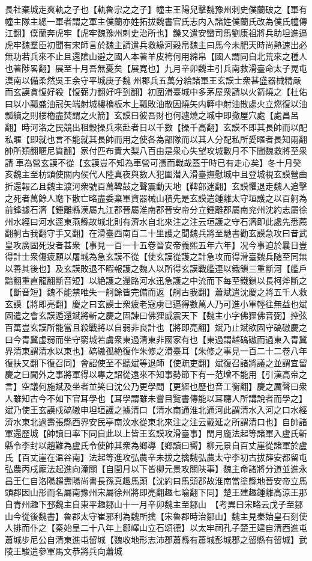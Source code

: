長社棄城走爽軌之子也【軌魯宗之之子】幢主王陽兒擊魏豫州刺史僕蘭破之【軍有幢主隊主總一軍者謂之軍主僕蘭亦姓拓拔魏書官氏志内入諸姓僕蘭氏改為僕氏幢傳江翻】僕蘭奔虎牢【虎牢魏豫州刺史治所也】鑠又遣安蠻司馬劉康祖將兵助坦進逼虎牢魏羣臣初聞有宋師言於魏主請遣兵救緣河穀帛魏主曰馬今未肥天時尚熱速出必無功若兵來不止且還隂山避之國人本著羊皮袴何用綿帛【國人謂同自北荒來之種人也著陟畧翻】展至十月吾無憂矣【展寛也】九月辛卯魏主引兵南救滑臺命太子晃屯漠南以備柔然吳王余守平城庚子魏州郡兵五萬分給諸軍王玄謨士衆甚盛器械精嚴而玄謨貪愎好殺【愎弼力翻好呼到翻】初圍滑臺城中多茅屋衆請以火箭燒之【杜佑曰以小瓢盛油冠矢端射城樓櫓板木上瓢敗油散因燒矢内簳中射油散處火立燃復以油瓢續之則樓櫓盡焚謂之火箭】玄謨曰彼吾財也何遽燒之城中即撤屋穴處【處昌呂翻】時河洛之民競出租穀操兵來赴者日以千數【操千高翻】玄謨不即其長帥而以配私暱【即就也言不能就其長帥而用之使各為部隊而以其人分配私所愛暱者長知兩翻帥所類翻暱尼質翻】家付匹布責大梨八百由是衆心失望攻城數月不下聞魏救將至衆請車為營玄謨不從【玄謨豈不知為車營可憑而戰哉蓋于時已有走心矣】冬十月癸亥魏主至枋頭使關内侯代人陸真夜與數人犯圍潜入滑臺撫慰城中且登城視玄謨營曲折還報乙且魏主渡河衆號百萬鞞鼔之聲震動天地【鞞部迷翻】玄謨懼退走魏人追擊之死者萬餘人麾下散亡略盡委棄軍資器械山積先是玄謨遣鍾離太守垣護之以百舸為前鋒據石濟【鍾離縣漢屬九江郡晉屬淮南郡晉安帝分立鍾離郡屬南兖州沈約志屬徐州水經曰河水逕東燕縣故城北則有濟水自北來注之注云垣護之守石濟即此處先悉薦翻舸古我翻守手又翻】在滑臺西南百二十里護之聞魏兵將至馳書勸玄謨急攻曰昔武皇攻廣固死没者甚衆【事見一百一十五卷晉安帝義熙五年六年】况今事迫於曩日豈得計士衆傷疲願以屠城為急玄謨不從【使玄謨從護之計急攻而得滑臺魏兵随至同無以善其後也】及玄謨敗退不暇報護之魏人以所得玄謨戰艦連以鐵鎻三重斷河【艦戶黯翻重直龍翻斷音短】以絶護之還路河水迅急護之中流而下每至鐵鎖以長柯斧斷之【斷音短】魏不能禁唯失一舸餘皆完備而返【舸古我翻】蕭斌遣沈慶之將五千人救玄謨【將即亮翻】慶之曰玄謨士衆疲老寇虜已逼得數萬人乃可進小軍輕往無益也斌固遣之會玄謨遁還斌將斬之慶之固諫曰佛狸威震天下【魏主小字佛狸佛音弼】控弦百萬豈玄謨所能當且殺戰將以自弱非良計也【將即亮翻】斌乃止斌欲固守碻磝慶之曰今青冀虚弱而坐守窮城若虜衆東過清東非國家有也【東過謂越碻磝而過東入青冀界清東謂清水以東也】碻磝孤絶復作朱修之滑臺耳【朱修之事見一百二十二卷八年復扶又翻下復召同】會詔使至不聽斌等退師【使疏吏翻】斌復召諸將議之並謂宜留慶之曰閫外之事將軍得以專之詔從遠來不知事勢節下有一范增不能用【引漢高帝之言】空議何施斌及坐者並笑曰沈公乃更學問【更經也歷也音工衡翻】慶之厲聲曰衆人雖知古今不如下官耳學也【耳學謂雖未嘗目覽書傳能以耳聽人所講說者而學之】斌乃使王玄謨戍碻磝申坦垣護之據清口【清水南通淮北通河此謂清水入河之口水經濟水東北過壽張縣西界安民亭南汶水從東北來注之注云戴延之所謂清口也】自帥諸軍還歷城【帥讀曰率下同自此以上皆王玄謨攻滑臺事】閏月龐法起等諸軍入盧氏斬縣令李封以趙難為盧氏令使帥其衆為鄉導【鄉讀曰嚮】柳元景自百丈崖從諸軍於盧氏【百丈崖在温谷南】法起等進攻弘農辛未拔之擒魏弘農太守李初古拔薛安都留屯弘農丙戌龐法起進向潼關【自閏月以下皆柳元景攻關陜事】魏主命諸將分道並進永昌王仁自洛陽趨夀陽尚書長孫真趣馬頭【沈約曰馬頭郡故淮南當塗縣地晉安帝立馬頭郡因山形而名屬南豫州宋屬徐州將即亮翻趣七喻翻下同】楚王建趣鍾離高涼王那自青州趣下邳魏主自東平趣鄒山十一月辛卯魏主至鄒山　【考異曰宋略云戊子至鄒山今從後魏書】魯郡太守崔邪利為魏所擒【宋魯郡時治鄒山】魏主見秦始皇石刻使人排而仆之【秦始皇二十八年上鄒嶧山立石頌德】以太牢祠孔子楚王建自清西進屯蕭城步尼公自清東進屯留城【魏收地形志沛郡蕭縣有蕭城彭城郡之留縣有留城】武陵王駿遣參軍馬文恭將兵向蕭城